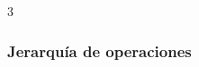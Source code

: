 {\begin{multicols}{3}
            \end{multicols}
      }

	\subsubsection{Jerarquía de operaciones}
  
